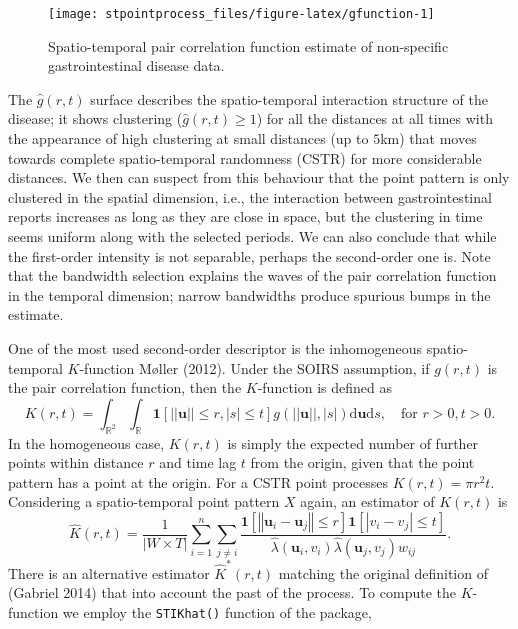 \begin{figure}

{\centering \texttt{[image: stpointprocess\_files/figure-latex/gfunction-1]} 

}

\caption{Spatio-temporal pair correlation function estimate of non-specific gastrointestinal disease data.}\label{fig:gfunction}
\end{figure}

The \(\hat{g}(r,t)\) surface describes the spatio-temporal interaction structure of the disease; it shows clustering (\(\hat{g}(r,t)\geq 1\)) for all the distances at all times with the appearance of high clustering at small distances (up to \(5\)km) that moves towards complete spatio-temporal randomness (CSTR) for more considerable distances. We then can suspect from this behaviour that the point pattern is only clustered in the spatial dimension, i.e., the interaction between gastrointestinal reports increases as long as they are close in space, but the clustering in time seems uniform along with the selected periods. We can also conclude that while the first-order intensity is not separable, perhaps the second-order one is. Note that the bandwidth selection explains the waves of the pair correlation function in the temporal dimension; narrow bandwidths produce spurious bumps in the estimate.

One of the most used second-order descriptor is the inhomogeneous spatio-temporal \(K\)-function Møller (2012). Under the SOIRS assumption, if \(g(r,t)\) is the pair correlation function, then the \(K\)-function is defined as
\[
    K(r,t) = \int_{\mathbb{R}^2}\int_{\mathbb{R}} \mathbf{1}[||\mathbf{u}||\leq r, |s|\leq t] g(||\mathbf{u}||,|s|)  \text{d} \mathbf{u} \text{d} s, \quad \text{for }r>0,t>0.
\]
In the homogeneous case, \(K(r,t)\) is simply the expected number of further points within distance \(r\) and time lag \(t\) from the origin, given that the point pattern has a point at the origin. For a CSTR point processes \(K(r,t)= \pi r^2 t\). Considering a spatio-temporal point pattern \(X\) again, an estimator of \(K(r,t)\) is
\[
    \hat{K}(r,t)= \frac{1}{|W\times T|}\sum_{i=1}^n \sum_{j\neq i}
    \frac{\mathbf{1}\left[ \left\Vert \mathbf{u}_{i}-\mathbf{u}_{j}\right\Vert \leq r\right]\mathbf{1}\left[\left\vert v_{i}-v_{j}\right\vert \leq t\right]}{\hat{\lambda} \left( \mathbf{u}_{i},v_{i}\right) \hat{\lambda} \left(\mathbf{u}_{j},v_{j}\right) w_{ij}}.
\]
There is an alternative estimator \(\hat{K}^*(r,t)\) matching the original definition of (Gabriel 2014) that into account the past of the process. To compute the \(K\)-function we employ the \texttt{STIKhat()} function of the  package,

